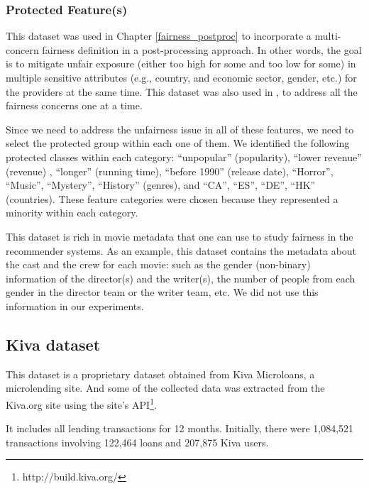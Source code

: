         \subsubsection{Protected Feature(s)}

        This dataset was used in Chapter \ref{fairness_postproc}  to incorporate a multi-concern fairness definition in a post-processing approach. In other words, the goal is to mitigate unfair exposure (either too high for some and too low for some) in multiple sensitive attributes (e.g., country, and economic sector, gender, etc.) for the providers at the same time. This dataset was also used in , to address all the fairness concerns one at a time.
    
        Since we need to address the unfairness issue in all of these features, we need to select the protected group within each one of them.
        We identified the following protected classes within each category: ``unpopular'' (popularity), ``lower revenue'' (revenue) , ``longer'' (running time), ``before 1990'' (release date), ``Horror'', ``Music'', ``Mystery'', ``History'' (genres), and ``CA'', ``ES'', ``DE'', ``HK'' (countries). These feature categories were chosen because they represented a minority within each category.
    
        This dataset is rich in movie metadata that one can use to study fairness in the recommender systems. As an example, this dataset contains the metadata about the cast and the crew for each movie: such as the gender (non-binary) information of the director(s) and the writer(s), the number of people from each gender in the director team or the writer team, etc. We did not use this information in our experiments.

    \subsection{Kiva dataset}
    This dataset is a proprietary dataset obtained from Kiva Microloans, a microlending site. And some of the collected data was extracted from the Kiva.org site using the site's API\footnote{http://build.kiva.org/}.
    
    It includes all lending transactions for 12 months. Initially, there were 1,084,521 transactions involving 122,464 loans and 207,875 Kiva users.
    
